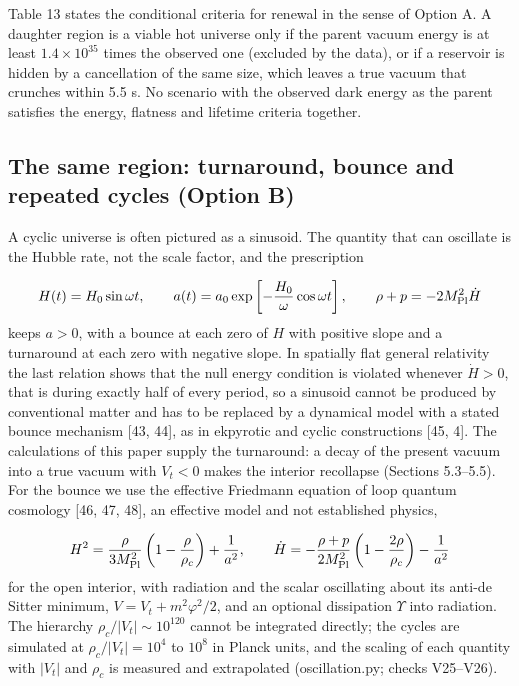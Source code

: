 \documentclass[11pt,a4paper]{article}
\begin{document}
Table 13 states the conditional criteria for renewal in the sense of Option A. A daughter region is a viable hot universe only if the parent vacuum energy is at least $1.4\times10^{35}$ times the observed one (excluded by the data), or if a reservoir is hidden by a cancellation of the same size, which leaves a true vacuum that crunches within 5.5 s. No scenario with the observed dark energy as the parent satisfies the energy, flatness and lifetime criteria together.

\subsection{The same region: turnaround, bounce and repeated cycles (Option B)}
A cyclic universe is often pictured as a sinusoid. The quantity that can oscillate is the Hubble rate, not the scale factor, and the prescription

\begin{equation}
H(t)=H_0\sin\omega t,\qquad a(t)=a_0\exp\left[-\frac{H_0}{\omega}\cos\omega t\right],\qquad \rho+p=-2M_{\rm Pl}^2\dot H
\end{equation}
keeps $a>0$, with a bounce at each zero of $H$ with positive slope and a turnaround at each zero with negative slope. In spatially flat general relativity the last relation shows that the null energy condition is violated whenever $\dot H>0$, that is during exactly half of every period, so a sinusoid cannot be produced by conventional matter and has to be replaced by a dynamical model with a stated bounce mechanism [43, 44], as in ekpyrotic and cyclic constructions [45, 4]. The calculations of this paper supply the turnaround: a decay of the present vacuum into a true vacuum with $V_t<0$ makes the interior recollapse (Sections 5.3--5.5). For the bounce we use the effective Friedmann equation of loop quantum cosmology [46, 47, 48], an effective model and not established physics,

\begin{equation}
H^2=\frac{\rho}{3M_{\rm Pl}^2}\left(1-\frac{\rho}{\rho_c}\right)+\frac{1}{a^2},\qquad \dot H=-\frac{\rho+p}{2M_{\rm Pl}^2}\left(1-\frac{2\rho}{\rho_c}\right)-\frac{1}{a^2}
\end{equation}
for the open interior, with radiation and the scalar oscillating about its anti-de Sitter minimum, $V=V_t+m^2\varphi^2/2$, and an optional dissipation $\Upsilon$ into radiation. The hierarchy $\rho_c/|V_t|\sim10^{120}$ cannot be integrated directly; the cycles are simulated at $\rho_c/|V_t|=10^4$ to $10^8$ in Planck units, and the scaling of each quantity with $|V_t|$ and $\rho_c$ is measured and extrapolated (oscillation.py; checks V25--V26).
\end{document}
